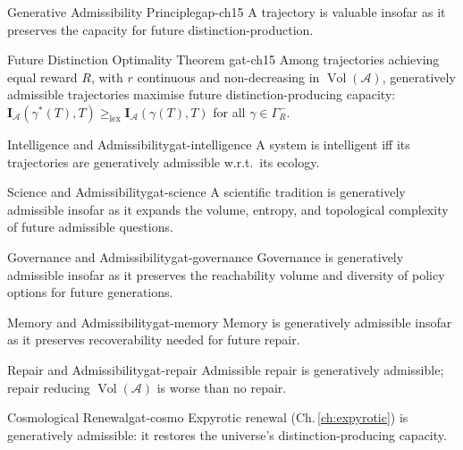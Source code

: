 \documentclass[12pt,twoside,openright]{book}
\newcommand{\adm}{\mathcal{A}}
\newcommand{\Vol}{\operatorname{Vol}}
\begin{document}
\begin{principle}{Generative Admissibility Principle}{gap-ch15}
  A trajectory is valuable insofar as it preserves the
  capacity for future distinction-production.
\end{principle}

\begin{theorem}{Future Distinction Optimality Theorem}%
  {gat-ch15}
  Among trajectories achieving equal reward $R$, with
  $r$ continuous and non-decreasing in $\Vol(\adm)$,
  generatively admissible trajectories maximise
  future distinction-producing capacity:
  $\mathbf{I}_\adm(\gamma^*(T),T)
  \ge_\mathrm{lex}\mathbf{I}_\adm(\gamma(T),T)$
  for all $\gamma\in\Gamma_R^-$.
\end{theorem}

\begin{corollary}{Intelligence and Admissibility}{gat-intelligence}
  A system is intelligent iff its trajectories are
  generatively admissible w.r.t.\ its ecology.
\end{corollary}
\begin{corollary}{Science and Admissibility}{gat-science}
  A scientific tradition is generatively admissible insofar
  as it expands the volume, entropy, and topological
  complexity of future admissible questions.
\end{corollary}
\begin{corollary}{Governance and Admissibility}{gat-governance}
  Governance is generatively admissible insofar as it
  preserves the reachability volume and diversity of
  policy options for future generations.
\end{corollary}
\begin{corollary}{Memory and Admissibility}{gat-memory}
  Memory is generatively admissible insofar as it
  preserves recoverability needed for future repair.
\end{corollary}
\begin{corollary}{Repair and Admissibility}{gat-repair}
  Admissible repair is generatively admissible;
  repair reducing $\Vol(\adm)$ is worse than no repair.
\end{corollary}
\begin{corollary}{Cosmological Renewal}{gat-cosmo}
  Expyrotic renewal (Ch.\,\ref{ch:expyrotic}) is
  generatively admissible: it restores the universe's
  distinction-producing capacity.
\end{corollary}
\end{document}
